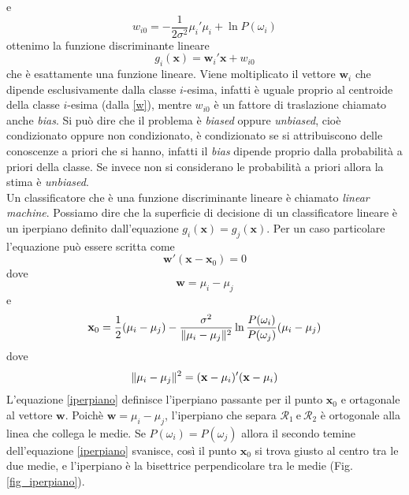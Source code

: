 e
\begin{equation}
w_{i0} = - \frac{1}{2\sigma^2} \mu_i' \mu_i + \ln P(\omega_i)
\end{equation}
ottenimo la funzione discriminante lineare
\begin{equation}
g_i(\mathbf{x}) = \mathbf{w}_i'\mathbf{x} + w_{i0}
\end{equation}
che è esattamente una funzione lineare. Viene moltiplicato il vettore $\mathbf{w}_i$ che dipende esclusivamente dalla classe $i$-esima, infatti è uguale proprio al centroide della classe $i$-esima (dalla \ref{w}), mentre $w_{i0}$ è un fattore di traslazione chiamato anche \emph{bias}. Si può dire che il problema è \emph{biased} oppure \emph{unbiased}, cioè condizionato oppure non condizionato, è condizionato se si attribuiscono delle conoscenze a priori che si hanno, infatti il \emph{bias} dipende proprio dalla probabilità a priori della classe. Se invece non si considerano le probabilità a priori allora la stima è \emph{unbiased}.\\
Un classificatore che è una funzione discriminante lineare è chiamato \emph{linear machine}. 
Possiamo dire che la superficie di decisione di un classificatore lineare è un iperpiano definito dall'equazione $g_i(\mathbf{x}) = g_j(\mathbf{x})$. Per un caso particolare l'equazione può essere scritta come
\begin{equation}
\mathbf{w}'(\mathbf{x - x}_0) = 0
\end{equation}
dove
\begin{equation}
\mathbf{w} = \mu_i - \mu_j
\end{equation}
e
\begin{equation}\label{iperpiano}
\mathbf{x}_0 = \frac{1}{2}(\mu_i - \mu_j) - \frac{\sigma^2}{\lVert\mu_i - \mu_j\rVert^2} \ln \frac{P(\omega_i)}{P(\omega_j)}(\mu_i - \mu_j) 
\end{equation}
dove
\begin{equation}
\lVert\mu_i - \mu_j\rVert^2 =  (\mathbf{x} - \mathbf{\mu}_i)' (\mathbf{x} - \mathbf{\mu}_i) 
\end{equation}
L'equazione \ref{iperpiano} definisce l'iperpiano passante per il punto $\mathbf{x}_0$ e ortagonale al vettore $\mathbf{w}$. Poichè  $\mathbf{w} = \mu_i - \mu_j$, l'iperpiano che separa $\mathcal{R}_1 \  \text{e} \  \mathcal{R}_2$ è ortogonale alla linea che collega le medie. Se $P(\omega_i) = P(\omega_j)$ allora il secondo temine dell'equazione \ref{iperpiano} svanisce, così il punto $\mathbf{x}_0$ si trova giusto al centro tra le due medie, e l'iperpiano è la bisettrice perpendicolare tra le medie (Fig. \ref{fig_iperpiano}). 
